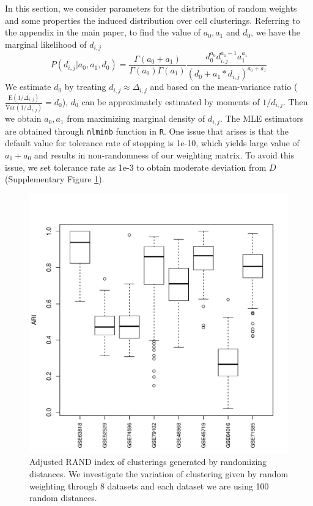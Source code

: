 \documentclass[aoas,preprint]{imsart}
\begin{document}
In this section, we consider  parameters for the distribution of random weights 
and some properties the induced distribution over cell clusterings. Referring to the appendix
in the main paper, to find the value of $a_0, a_1$ and $d_0$, 
we have the marginal likelihood of $d_{i,j}$ 
$$P(d_{i,j} | a_0, a_1, d_0) = \frac{\Gamma(a_0 + a_1)}{\Gamma(a_0)\Gamma(a_1)} \frac{d_0^{a_0} d_{i,j}^{a_1 - 1}a_1^{a_1}}{(d_0 + a_1 * d_{i,j})^{a_0 + a_1}}$$  
We estimate $d_0$ by treating $d_{i,j} \approx \Delta_{i,j}$ and based on the mean-variance ratio ($\frac{\text{E}(1/\Delta_{i,j})}{\text{Var}(1/\Delta_{i,j})} = d_0$), $d_0$ can be approximately estimated by moments of $1 / d_{i,j}$.
Then we obtain $a_0, a_1$ from maximizing marginal density of $d_{i,j}$. 
The MLE estimators are obtained through \verb+nlminb+ function in \verb+R+. One issue that arises is that the default value for tolerance rate of stopping is 1e-10, which yields large value of $a_1 + a_0$ and results in non-randomness of our weighting matrix. To avoid this issue, we set tolerance rate as 1e-3 to obtain moderate deviation from $D$ (Supplementary Figure \ref{fig:ARI}).
 
\begin{figure}[h!]
\includegraphics[scale = 0.7]{Figs/ARI.pdf}
 \caption{
 Adjusted RAND index of 
 clusterings generated by randomizing distances.
 We investigate the variation of clustering given by random weighting through 8 datasets 
 and each dataset we are using 100 random distances.
}
  \label{fig:ARI}
\end{figure}
\end{document}
